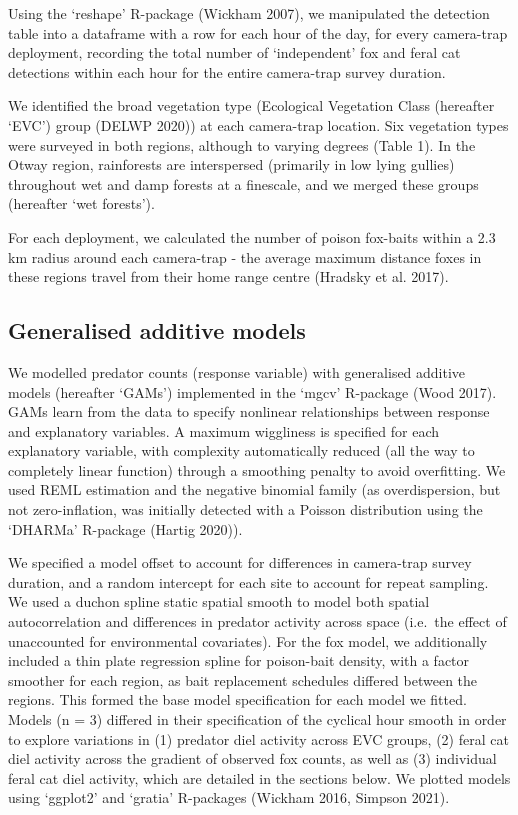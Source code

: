 \documentclass[]{elsarticle} %
\begin{document}
Using the `reshape' R-package (Wickham 2007), we manipulated the detection table into a dataframe with a row for each hour of the day, for every camera-trap deployment, recording the total number of `independent' fox and feral cat detections within each hour for the entire camera-trap survey duration.

We identified the broad vegetation type (Ecological Vegetation Class (hereafter `EVC') group (DELWP 2020)) at each camera-trap location. Six vegetation types were surveyed in both regions, although to varying degrees (Table 1). In the Otway region, rainforests are interspersed (primarily in low lying gullies) throughout wet and damp forests at a finescale, and we merged these groups (hereafter `wet forests').

For each deployment, we calculated the number of poison fox-baits within a 2.3 km radius around each camera-trap - the average maximum distance foxes in these regions travel from their home range centre (Hradsky et al. 2017).

\hypertarget{generalised-additive-models}{%
\subsection{Generalised additive models}\label{generalised-additive-models}}

We modelled predator counts (response variable) with generalised additive models (hereafter `GAMs') implemented in the `mgcv' R-package (Wood 2017). GAMs learn from the data to specify nonlinear relationships between response and explanatory variables. A maximum wiggliness is specified for each explanatory variable, with complexity automatically reduced (all the way to completely linear function) through a smoothing penalty to avoid overfitting. We used REML estimation and the negative binomial family (as overdispersion, but not zero-inflation, was initially detected with a Poisson distribution using the `DHARMa' R-package (Hartig 2020)).

We specified a model offset to account for differences in camera-trap survey duration, and a random intercept for each site to account for repeat sampling. We used a duchon spline static spatial smooth to model both spatial autocorrelation and differences in predator activity across space (i.e.~the effect of unaccounted for environmental covariates). For the fox model, we additionally included a thin plate regression spline for poison-bait density, with a factor smoother for each region, as bait replacement schedules differed between the regions. This formed the base model specification for each model we fitted. Models (n = 3) differed in their specification of the cyclical hour smooth in order to explore variations in (1) predator diel activity across EVC groups, (2) feral cat diel activity across the gradient of observed fox counts, as well as (3) individual feral cat diel activity, which are detailed in the sections below. We plotted models using `ggplot2' and `gratia' R-packages (Wickham 2016, Simpson 2021).
\end{document}
